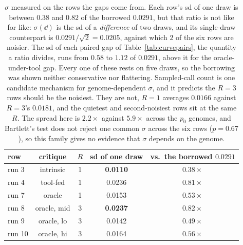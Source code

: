 \documentclass[11pt]{article}
\begin{document}
\begin{table}[h]
\centering
\small
\begin{tabular}{lcccc}
\toprule
row & critique & $R$ & sd of one draw & vs.\ the borrowed $0.0291$ \\
\midrule
run 3  & intrinsic          & 1 & \textbf{0.0110} & $0.38\times$ \\
run 4  & tool-fed           & 1 & 0.0236 & $0.81\times$ \\
run 7  & oracle             & 1 & 0.0153 & $0.53\times$ \\
run 8  & oracle, mid        & 3 & \textbf{0.0237} & $0.82\times$ \\
run 9  & oracle, lo         & 3 & 0.0142 & $0.49\times$ \\
run 10 & oracle, hi         & 3 & 0.0164 & $0.56\times$ \\
\bottomrule
\end{tabular}
\caption{$\sigma$ measured on the rows the gaps come from. Each row's sd of one draw is
between $0.38$ and $0.82$ of the borrowed $0.0291$, but that ratio is not like for like:
$\sigma(\dd)$ is the sd of a \emph{difference} of two draws, and its single-draw counterpart is
$0.0291/\sqrt{2} = 0.0205$, against which $2$ of the six rows are noisier. The sd of each
paired gap of Table~\ref{tab:curvepairs}, the quantity a ratio divides, runs from
$0.58$ to $1.12$ of $0.0291$, above it for the oracle-under-tool gap. Every one of these rests on
five draws, so the borrowing was shown neither conservative nor flattering. Sampled-call count is one candidate
mechanism for genome-dependent $\sigma$, and it predicts the $R{=}3$ rows
should be the noisiest. They are not, $R{=}1$ averages $0.0166$ against $R{=}3$'s $0.0181$, and
the quietest and second-noisiest rows sit at the same $R$. The spread here is $2.2\times$ against
$5.9\times$ across the $p_0$ genomes, and Bartlett's test does not reject one common $\sigma$
across the six rows ($p = 0.67$), so this family gives no evidence that $\sigma$ depends on the
genome.}
\label{tab:curvesigma}
\end{table}
\end{document}

